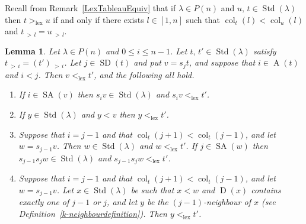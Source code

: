 \documentclass[10pt]{amsart}
\newtheorem{lemm}[theo]{Lemma}
\theoremstyle{definition}
\DeclareMathOperator{\lex}{lex}
\DeclareMathOperator{\col}{col}
\newcommand{\morethan}[2]{#1\,{_{>\,#2}}}
\DeclareMathOperator{\STD}{Std}
\DeclareMathOperator{\SD}{SD}
\DeclareMathOperator{\SA}{SA}
\DeclareMathOperator{\D}{D}
\DeclareMathOperator{\A}{A}
\begin{document}
Recall from Remark~\ref{LexTableauEquiv} that if $\lambda\in P(n)$ and
$u,\,t\in\STD(\lambda)$ then $t>_{\lex}u$ if and only if there exists $l\in[1,n]$
such that $\col_t(l)<\col_u(l)$ and $\morethan tl=\morethan ul$.
\begin{lemm}\label{xlexlessthant}
Let $\lambda\in P(n)$ and $0\leqslant i\leqslant n-1$. Let $t,\,t'\in\STD(\lambda)$ satisfy
$\morethan ti=\morethan {(t')}i$. Let $j\in \SD(t)$ and put $v=s_jt$, and suppose that
$i\in\A(t)$ and $i<j$. Then $v<_{\lex}t'$, and the following all hold.
\begin{enumerate}[label=(\roman*)]
\item\label{lemma7.30_i} If $i\in\SA(v)$ then $s_iv\in\STD(\lambda)$ and $s_iv<_{\lex}t'$.
\item\label{lemma7.30_ii} If $y\in\STD(\lambda)$ and $y<v$ then $y<_{\lex}t'$.
\item\label{lemma7.30_iii} Suppose that $i=j-1$ and that $\col_t(j+1)<\col_t(j-1)$, and
let $w=s_{j-1}v$. Then $w\in\STD(\lambda)$ and $w<_{\lex}t'$.
If $j\in\SA(w)$ then $s_{j-1}s_jw\in\STD(\lambda)$ and $s_{j-1}s_jw<_{\lex}t'$.
\item\label{lemma7.30_iv} Suppose that $i=j-1$ and that $\col_t(j+1)<\col_t(j-1)$, and
let $w=s_{j-1}v$. Let $x\in\STD(\lambda)$ be such that $x<w$ and $\D(x)$
contains exactly one of $j-1$ or $j$, and let $y$ be the $(j-1)$-neighbour
of $x$ (see Definition~\ref{k-neighbourdefinition}). Then $y<_{\lex}t'$.
\end{enumerate}
\end{lemm}
\end{document}
